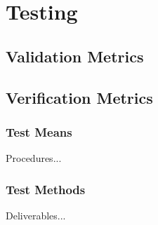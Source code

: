 \chapter{Testing}
\section{Validation Metrics}
\section{Verification Metrics}
\subsection{Test Means}
Procedures...
\subsection{Test Methods}
Deliverables...